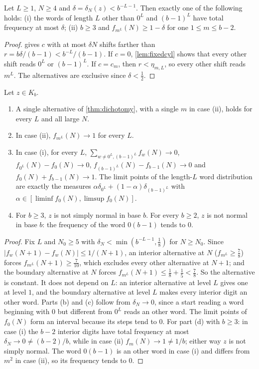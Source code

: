 \documentclass[11pt]{article}
\begin{document}
\begin{theorem}\label{thm:dichotomy}
Let $L\ge1$, $N\ge4$ and $\delta=\delta_N(z)<b^{-L-1}$. Then exactly one of the following holds:
\textup{(i)} the words of length $L$ other than $0^L$ and $(b-1)^L$ have total frequency at most
$\delta$; \textup{(ii)} $b\ge3$ and $f_{m^L}(N)\ge1-\delta$ for one $1\le m\le b-2$.
\end{theorem}

\begin{proof}
 gives $c$ with at most $\delta N$ shifts farther than
$r=b\delta/(b-1)<b^{-L}/(b-1)$. If $c=0$, \cref{lem:fixedcyl} shows that every other shift reads
$0^L$ or $(b-1)^L$. If $c=c_m$, then $r<\eta_{m,L}$, so every other shift reads $m^L$. The
alternatives are exclusive since $\delta<\frac12$.
\end{proof}

\begin{theorem}[Classification in $K_b$]\label{thm:classification}
Let $z\in K_b$.
\begin{enumerate}[label=\textup{(\alph*)},nosep]
\item A single alternative of \cref{thm:dichotomy}, with a single $m$ in case (ii), holds for every
$L$ and all large $N$.
\item In case (ii), $f_{m^L}(N)\to1$ for every $L$.
\item In case (i), for every $L$, $\sum_{w\ne0^L,(b-1)^L}f_w(N)\to0$,
$f_{0^L}(N)-f_0(N)\to0$, $f_{(b-1)^L}(N)-f_{b-1}(N)\to0$ and $f_0(N)+f_{b-1}(N)\to1$. The limit
points of the length-$L$ word distribution are exactly the measures
$\alpha\delta_{0^L}+(1-\alpha)\delta_{(b-1)^L}$ with $\alpha\in[\liminf f_0(N),\limsup f_0(N)]$.
\item For $b\ge3$, $z$ is not simply normal in base $b$. For every $b\ge2$, $z$ is not normal in
base $b$: the frequency of the word $0(b-1)$ tends to $0$.
\end{enumerate}
\end{theorem}

\begin{proof}
Fix $L$ and $N_0\ge5$ with $\delta_N<\min(b^{-L-1},\frac18)$ for $N\ge N_0$. Since
$|f_w(N+1)-f_w(N)|\le1/(N+1)$, an interior alternative at $N$ ($f_{m^L}\ge\frac78$) forces
$f_{m^L}(N+1)\ge\frac7{10}$, which excludes every other alternative at $N+1$; and the boundary
alternative at $N$ forces $f_{m^L}(N+1)\le\frac18+\frac15<\frac78$. So the alternative is constant.
It does not depend on $L$: an interior alternative at level $L$ gives one at level $1$, and the
boundary alternative at level $L$ makes every interior digit an other word. Parts (b) and (c) follow
from $\delta_N\to0$, since a start reading a word beginning with $0$ but different from $0^L$ reads
an other word. The limit points of $f_0(N)$ form an interval because its steps tend to $0$. For
part (d) with $b\ge3$: in case (i) the $b-2$ interior digits have total frequency at most
$\delta_N\to0\ne(b-2)/b$, while in case (ii) $f_m(N)\to1\ne1/b$; either way $z$ is not simply
normal. The word $0(b-1)$ is an other word in case (i) and differs from $m^2$ in case (ii), so
its frequency tends to $0$.
\end{proof}
\end{document}
